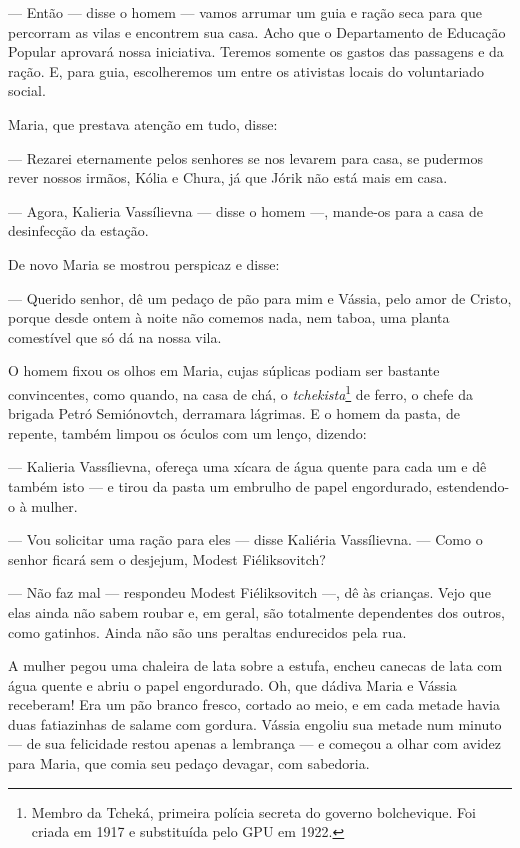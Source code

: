 --- Então --- disse o homem --- vamos arrumar um guia e ração seca para
que percorram as vilas e encontrem sua casa. Acho que o Departamento de
Educação Popular aprovará nossa iniciativa. Teremos somente os gastos
das passagens e da ração. E, para guia, escolheremos um entre os
ativistas locais do voluntariado social.

Maria, que prestava atenção em tudo, disse:

--- Rezarei eternamente pelos senhores se nos levarem para casa, se
pudermos rever nossos irmãos, Kólia e Chura, já que Jórik não está mais
em casa.

--- Agora, Kalieria Vassílievna --- disse o homem ---, mande-os para a
casa de desinfecção da estação.

De novo Maria se mostrou perspicaz e disse:

--- Querido senhor, dê um pedaço de pão para mim e Vássia, pelo amor de
Cristo, porque desde ontem à noite não comemos nada, nem taboa, uma
planta comestível que só dá na nossa vila.

O homem fixou os olhos em Maria, cujas súplicas podiam ser bastante
convincentes, como quando, na casa de chá, o \emph{tchekista}\footnote{Membro
  da Tcheká, primeira polícia secreta do governo bolchevique. Foi criada
  em 1917 e substituída pelo GPU em 1922.} de ferro, o chefe da brigada
Petró Semiónovtch, derramara lágrimas. E o homem da pasta, de repente,
também limpou os óculos com um lenço, dizendo:

--- Kalieria Vassílievna, ofereça uma xícara de água quente para cada um
e dê também isto --- e tirou da pasta um embrulho de papel engordurado,
estendendo-o à mulher.

--- Vou solicitar uma ração para eles --- disse Kaliéria Vassílievna.
--- Como o senhor ficará sem o desjejum, Modest Fiéliksovitch?

--- Não faz mal --- respondeu Modest Fiéliksovitch ---, dê às crianças.
Vejo que elas ainda não sabem roubar e, em geral, são totalmente
dependentes dos outros, como gatinhos. Ainda não são uns peraltas
endurecidos pela rua.

A mulher pegou uma chaleira de lata sobre a estufa, encheu canecas de
lata com água quente e abriu o papel engordurado. Oh, que dádiva Maria e
Vássia receberam! Era um pão branco fresco, cortado ao meio, e em cada
metade havia duas fatiazinhas de salame com gordura. Vássia engoliu sua
metade num minuto --- de sua felicidade restou apenas a lembrança --- e
começou a olhar com avidez para Maria, que comia seu pedaço devagar, com
sabedoria.

